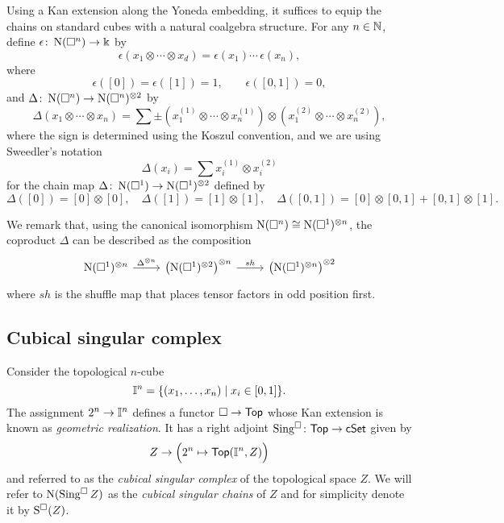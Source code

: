 Using a Kan extension along the Yoneda embedding, it suffices to equip the chains on standard cubes with a natural coalgebra structure.
For any $n \in \mathbb{N}$, define $\epsilon \colon \operatorname{N}(\square^n) \to \Bbbk$ by
\[
\epsilon \left( x_1 \otimes \cdots \otimes x_d \right) = \epsilon(x_1) \cdots \, \epsilon(x_n),
\]
where
\[
\epsilon([0]) = \epsilon([1]) = 1, \qquad \epsilon([0, 1]) = 0,
\] 
and $\Delta \colon \operatorname{N}(\square^n) \to \operatorname{N}(\square^n)^{\otimes 2}$ by
\[	
\Delta (x_1 \otimes \cdots \otimes x_n) = 	
\sum \pm \left( x_1^{(1)} \otimes \cdots \otimes x_n^{(1)} \right) \otimes 	
\left( x_1^{(2)} \otimes \cdots \otimes x_n^{(2)} \right),	
\]	
where the sign is determined using the Koszul convention, and we are using Sweedler's notation
\[	
\Delta(x_i) = \sum x_i^{(1)} \otimes x_i^{(2)}
\]
for the chain map $\Delta \colon \operatorname{N}(\square^1) \to \operatorname{N}(\square^1)^{\otimes 2}$ defined by
\[
\Delta([0]) = [0] \otimes [0], \quad \Delta([1]) = [1] \otimes [1], \quad \Delta([0,1]) = [0] \otimes [0,1] + [0,1] \otimes [1].
\]

We remark that, using the canonical isomorphism $\operatorname{N}(\square^n) \cong \operatorname{N}(\square^1)^{\otimes n}$, the coproduct $\Delta$ can be described as the composition
\[
\begin{tikzcd}
\chains(\cube^1)^{\otimes n} \arrow[r, "\Delta^{\otimes n}"] & \left( \chains(\cube^1)^{\otimes 2}  \right)^{\otimes n} \arrow[r, "sh"] & \left( \chains(\cube^1)^{\otimes n} \right)^{\otimes 2}
\end{tikzcd}
\]
where $sh$ is the shuffle map that places tensor factors in odd position first.

\subsection{Cubical singular complex}

Consider the topological $n$-cube
\[
\mathbb{I}^{n} = \{(x_1, \dots, x_n) \mid x_i \in [0,1]\}.
\]
The assignment $2^n \to \mathbb{I}^n$ defines a functor $\square \to \mathsf{Top}$ whose Kan extension is known as \textit{geometric realization}.
It has a right adjoint $\operatorname{Sing^{\square}} \colon \mathsf{Top} \to \mathsf{cSet}$ given by
\[
Z \to \Big(2^n \mapsto \mathsf{Top}(\mathbb{I}^n, Z)\Big)
\]
and referred to as the \textit{cubical singular complex} of the topological space $Z$.
We will refer to $\operatorname{N}(\operatorname{Sing^{\square}} Z)$ as the \textit{cubical singular chains} of $Z$ and for simplicity denote it by $\operatorname{S^{\square}}(Z)$.